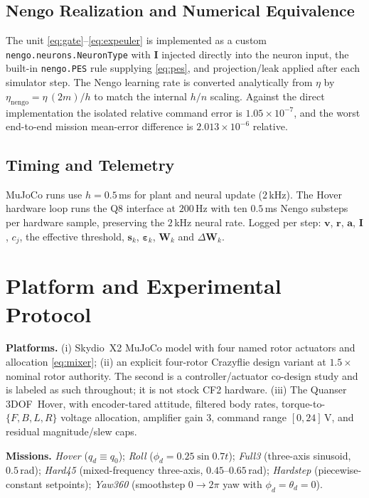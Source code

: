 \documentclass[letterpaper,10pt,conference]{IEEEtran}
\begin{document}
\subsection{Nengo Realization and Numerical Equivalence}

The unit \eqref{eq:gate}--\eqref{eq:expeuler} is implemented as a custom
\texttt{nengo.neurons.NeuronType} with $\bm I$ injected directly into the
neuron input, the built-in \texttt{nengo.PES} rule supplying
\eqref{eq:pes}, and projection/leak applied after each simulator step. The
Nengo learning rate is converted analytically from $\eta$ by
$\eta_{\mathrm{nengo}}=\eta\,(2m)/h$ to match the internal $h/n$ scaling.
Against the direct implementation the isolated relative command error is
$1.05\times10^{-7}$, and the worst end-to-end mission mean-error difference
is $2.013\times10^{-6}$ relative.

\subsection{Timing and Telemetry}

MuJoCo runs use $h=0.5$\,ms for plant and neural update ($2$\,kHz). The
Hover hardware loop runs the Q8 interface at $200$\,Hz with ten $0.5$\,ms
Nengo substeps per hardware sample, preserving the $2$\,kHz neural rate.
Logged per step: $\bm v$, $\bm r$, $\bm a$, $\bm I$, $c_j$, the effective
threshold, $\bm s_k$, $\bm\varepsilon_k$, $\bm W_k$ and $\Delta\bm W_k$.

\section{Platform and Experimental Protocol}
\label{sec:platform_method}

\textbf{Platforms.} (i) Skydio~X2 MuJoCo model \cite{todorov2012mujoco} with
four named rotor actuators and allocation \eqref{eq:mixer}; (ii) an explicit
four-rotor Crazyflie design variant at $1.5\times$ nominal rotor authority.
The second is a controller/actuator co-design study and is labeled as such
throughout; it is not stock CF2 hardware. (iii) The Quanser 3DOF~Hover, with
encoder-tared attitude, filtered body rates, torque-to-$\{F,B,L,R\}$ voltage
allocation, amplifier gain $3$, command range $[0,24]$\,V, and residual
magnitude/slew caps.

\textbf{Missions.} \emph{Hover} ($q_d\equiv q_0$); \emph{Roll}
($\phi_d=0.25\sin0.7t$); \emph{Full3} (three-axis sinusoid, $0.5$\,rad);
\emph{Hard45} (mixed-frequency three-axis, $0.45$--$0.65$\,rad);
\emph{Hardstep} (piecewise-constant setpoints); \emph{Yaw360} (smoothstep
$0\!\to\!2\pi$ yaw with $\phi_d=\theta_d=0$).
\end{document}
